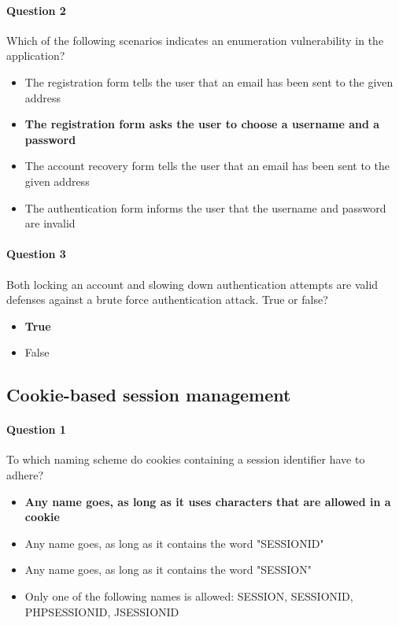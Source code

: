 \documentclass[titlepage]{article}
\begin{document}
    \paragraph{Question 2} Which of the following scenarios indicates an enumeration vulnerability in the application?
    \begin{itemize}
        \item The registration form tells the user that an email has been sent to the given address
        \item \textbf{The registration form asks the user to choose a username and a password} \checkmark
        \item The account recovery form tells the user that an email has been sent to the given address
        \item The authentication form informs the user that the username and password are invalid
    \end{itemize}
    \paragraph{Question 3} Both locking an account and slowing down authentication attempts are valid defenses against a brute force authentication attack. True or false?
    \begin{itemize}
        \item \textbf{True} \checkmark
        \item False
    \end{itemize}
    \subsection{Cookie-based session management}
    \paragraph{Question 1} To which naming scheme do cookies containing a session identifier have to adhere?
    \begin{itemize}
        \item \textbf{Any name goes, as long as it uses characters that are allowed in a cookie} \checkmark
        \item Any name goes, as long as it contains the word "SESSIONID"
        \item Any name goes, as long as it contains the word "SESSION"
        \item Only one of the following names is allowed: SESSION, SESSIONID, PHPSESSIONID, JSESSIONID
    \end{itemize}
\end{document}
